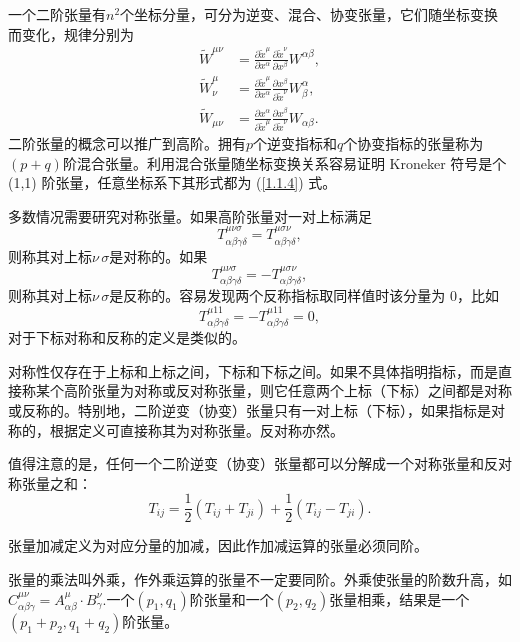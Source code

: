 \documentclass[11pt, a4paper, oneside, onecolumn]{ctexart}
\numberwithin{equation}{subsection}
\begin{document}
一个二阶张量有$n^{2}$个坐标分量，可分为逆变、混合、协变张量，它们随坐标变换而变化，规律分别为
\begin{align}
\widetilde{W}^{\mu\nu}&=\frac{\partial{}\widetilde{x}^{\mu}}{\partial{}x^{\alpha}}\frac{\partial{}\widetilde{x}^{\nu}}{\partial{}x^{\beta}}W^{\alpha\beta},\\
\widetilde{W}^{\mu}_{\nu}&=\frac{\partial{}\widetilde{x}^{\mu}}{\partial{}x^{\alpha}}\frac{\partial{}{x}^{\beta}}{\partial{}\widetilde{x}^{\nu}}W^{\alpha}_{\beta},\\
\widetilde{W}_{\mu\nu}&=\frac{\partial{}{x}^{\alpha}}{\partial{}\widetilde{x}^{\mu}}\frac{\partial{}{x}^{\beta}}{\partial{}\widetilde{x}^{\nu}}W_{\alpha\beta}.
\end{align}
二阶张量的概念可以推广到高阶。拥有$p$个逆变指标和$q$个协变指标的张量称为$\left(p+q\right)$阶混合张量。利用混合张量随坐标变换关系容易证明 Kroneker 符号是个 (1,1) 阶张量，任意坐标系下其形式都为 (\ref{1.1.4}) 式。

多数情况需要研究对称张量。如果高阶张量对一对上标满足
\begin{equation}
T^{\mu\nu\sigma}_{\alpha\beta\gamma\delta{}}=T^{\mu\sigma\nu}_{\alpha\beta\gamma\delta{}},
\end{equation}
则称其对上标$\nu\,\sigma$是对称的。如果
\begin{equation}
T^{\mu\nu\sigma}_{\alpha\beta\gamma\delta{}}=-T^{\mu\sigma\nu}_{\alpha\beta\gamma\delta{}},
\end{equation}
则称其对上标$\nu\,\sigma$是反称的。容易发现两个反称指标取同样值时该分量为 0，比如
\begin{equation}
T^{\mu11}_{\alpha\beta\gamma\delta{}}=-T^{\mu11}_{\alpha\beta\gamma\delta{}}=0,
\end{equation}
对于下标对称和反称的定义是类似的。

对称性仅存在于上标和上标之间，下标和下标之间。如果不具体指明指标，而是直接称某个高阶张量为对称或反对称张量，则它任意两个上标（下标）之间都是对称或反称的。特别地，二阶逆变（协变）张量只有一对上标（下标），如果指标是对称的，根据定义可直接称其为对称张量。反对称亦然。

值得注意的是，任何一个二阶逆变（协变）张量都可以分解成一个对称张量和反对称张量之和：
\begin{equation}
T_{ij}=\frac{1}{2}\left(T_{ij}+T_{ji}\right)+\frac{1}{2}\left(T_{ij}-T_{ji}\right).
\end{equation}

张量加减定义为对应分量的加减，因此作加减运算的张量必须同阶。

张量的乘法叫外乘，作外乘运算的张量不一定要同阶。外乘使张量的阶数升高，如$C_{\alpha\beta\gamma}^{\mu\nu}=A_{\alpha\beta}^{\mu}\cdot B_{\gamma}^{\nu}$.一个$\left(p_{1},q_{1}\right)$阶张量和一个$\left(p_{2},q_{2}\right)$张量相乘，结果是一个$\left(p_{1}+p_{2},q_{1}+q_{2}\right)$阶张量。
\end{document}

